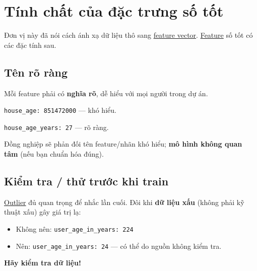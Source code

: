 \documentclass[12pt,a4paper]{article}
\begin{document}
\section{Tính chất của đặc trưng số tốt}

Đơn vị này đã nói cách ánh xạ dữ liệu thô sang \href{https://developers.google.com/machine-learning/glossary\#feature-vector}{feature vector}. \href{https://developers.google.com/machine-learning/glossary\#feature}{Feature} số tốt có các đặc tính sau.

\subsection{Tên rõ ràng}

Mỗi feature phải có \textbf{nghĩa rõ}, dễ hiểu với mọi người trong dự án.

\begin{luuy}[title={Không nên}]
\texttt{house\_age: 851472000} --- khó hiểu.
\end{luuy}

\begin{luuy}[title={Nên}]
\texttt{house\_age\_years: 27} --- rõ ràng.
\end{luuy}

\begin{luuy}
Đồng nghiệp sẽ phản đối tên feature/nhãn khó hiểu; \textbf{mô hình không quan tâm} (nếu bạn chuẩn hóa đúng).
\end{luuy}

\subsection{Kiểm tra / thử trước khi train}

\href{https://developers.google.com/machine-learning/glossary\#outliers}{Outlier} đủ quan trọng để nhắc lần cuối. Đôi khi \textbf{dữ liệu xấu} (không phải kỹ thuật xấu) gây giá trị lạ:

\begin{itemize}
  \item Không nên: \texttt{user\_age\_in\_years: 224}
  \item Nên: \texttt{user\_age\_in\_years: 24} --- có thể do nguồn không kiểm tra.
\end{itemize}

\textbf{Hãy kiểm tra dữ liệu!}
\end{document}
